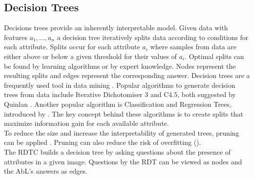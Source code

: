 \documentclass[a4paper,cleardoubleempty,BCOR1cm, 11pt]{report}
\begin{document}
\subsection{Decision Trees}
Decisions trees provide an inherently interpretable model. Given data with features $a_1, ..., a_n$ a decision tree iteratively splits data according to conditions for each attribute. Splits occur for each attribute $a_i$ where samples from data are either above or below a given threshold for their values of $a_i$. Optimal splits can be found by learning algorithms or by expert knowledge. Nodes represent the resulting splits and edges represent the corresponding answer.
Decision trees are a frequently used tool in data mining \cite{wu2008top}. Popular algorithms to generate decision trees from data include Iterative Dichotomiser 3 and C4.5, both suggested by Quinlan \cite{quinlan1986induction,quinlan2014c4}.
Another popular algorithm is Classification and Regression Trees, introduced by \citet{breiman1984classification}. The key concept behind these algorithms is to create splits that maximize information gain for each available attribute.\\
To reduce the size and increase the interpretability of generated trees, pruning can be applied \cite{mingers1989empirical}. Pruning can also reduce the risk of overfitting (\cite{kearns1998fast}).\\
The RDTC builds a decision tree by asking questions about the presence of attributes in a given image. Questions by the RDT can be viewed as nodes and the AbL's answers as edges.
\end{document}
